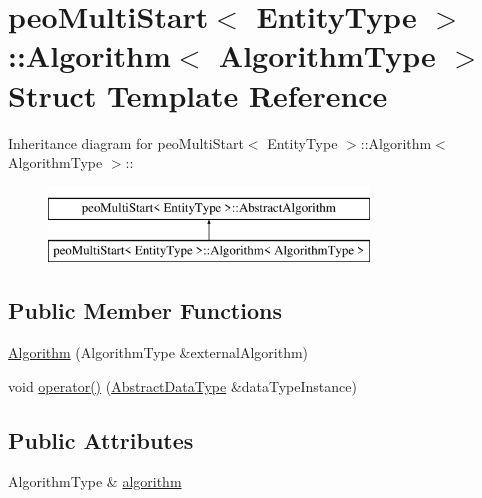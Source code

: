 \hypertarget{structpeoMultiStart_1_1Algorithm}{
\section{peo\-Multi\-Start$<$ Entity\-Type $>$::Algorithm$<$ Algorithm\-Type $>$ Struct Template Reference}
\label{structpeoMultiStart_1_1Algorithm}
}
Inheritance diagram for peo\-Multi\-Start$<$ Entity\-Type $>$::Algorithm$<$ Algorithm\-Type $>$::\begin{figure}[H]
\begin{center}
\leavevmode
\includegraphics[height=2cm]{structpeoMultiStart_1_1Algorithm}
\end{center}
\end{figure}
\subsection*{Public Member Functions}
\begin{CompactItemize}
\item 
\hypertarget{structpeoMultiStart_1_1Algorithm_39f0818e387b39c70432a96f512482ec}{
\hyperlink{structpeoMultiStart_1_1Algorithm_39f0818e387b39c70432a96f512482ec}{Algorithm} (Algorithm\-Type \&external\-Algorithm)}
\label{structpeoMultiStart_1_1Algorithm_39f0818e387b39c70432a96f512482ec}

\item 
\hypertarget{structpeoMultiStart_1_1Algorithm_73dc7bef0b4e1430910383ba51a3c4d4}{
void \hyperlink{structpeoMultiStart_1_1Algorithm_73dc7bef0b4e1430910383ba51a3c4d4}{operator()} (\hyperlink{structpeoMultiStart_1_1AbstractDataType}{Abstract\-Data\-Type} \&data\-Type\-Instance)}
\label{structpeoMultiStart_1_1Algorithm_73dc7bef0b4e1430910383ba51a3c4d4}

\end{CompactItemize}
\subsection*{Public Attributes}
\begin{CompactItemize}
\item 
\hypertarget{structpeoMultiStart_1_1Algorithm_e7a6e014c00ef0a7df5d429aba4f5f96}{
Algorithm\-Type \& \hyperlink{structpeoMultiStart_1_1Algorithm_e7a6e014c00ef0a7df5d429aba4f5f96}{algorithm}}
\label{structpeoMultiStart_1_1Algorithm_e7a6e014c00ef0a7df5d429aba4f5f96}

\end{CompactItemize}


